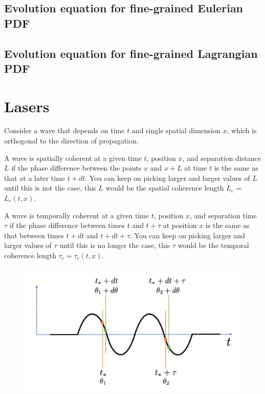 \documentclass[a4paper,11pt]{report}
\begin{document}
\section{Evolution equation for fine-grained Eulerian PDF}

\section{Evolution equation for fine-grained Lagrangian PDF}

\chapter{Lasers}
Consider a wave that depends on time $t$ and single spatial dimension $x$, which is orthogonal to the direction of propagation. 

A wave is spatially coherent at a given time $t$, position $x$, and separation distance $L$ if the phase difference between the points $x$ and $x+L$ at time $t$ is the same as that at a later time $t+dt$. You can keep on picking larger and larger values of $L$ until this is not the case, this $L$ would be the spatial coherence length $L_c$ = $L_c(t,x)$.

A wave is temporally coherent at a given time $t$, position $x$, and separation time $\tau$ if the phase difference between times $t$ and $t+\tau$ at position $x$ is the same as that between times $t+dt$ and $t+dt+\tau$. You can keep on picking larger and larger values of $\tau$ until this is no longer the case, this $\tau$ would be the temporal coherence length $\tau_c = \tau_c(t,x)$.

\begin{figure}
    \centering
    \includegraphics[width=.7\textwidth]{../../images/temp_cohe_1.pdf}
    \caption{}
    \label{fig:laser_temp_cohe}
\end{figure}
\end{document}
